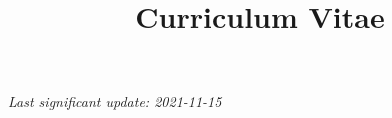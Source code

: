 \documentclass[12pt, letterpaper, sans, unicode]{moderncv}
\title{Curriculum Vitae}
\begin{document}
    \makecvtitle

    

    

    

    
    
    

    
    
    

    
    
    
    
    
    
    
    
    

    

    \emptysection{}\closesection
    \vfill
    \begin{center}
    \textit{\small Last significant update: 2021-11-15}
    \end{center}
\end{document}
